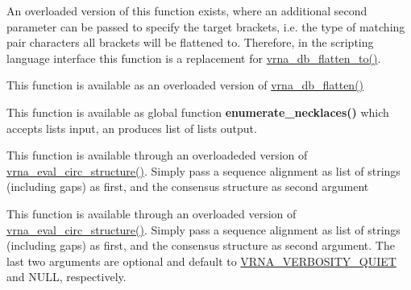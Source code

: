 \begin{DoxyRefList}
An overloaded version of this function exists, where an additional second parameter can be passed to specify the target brackets, i.\+e. the type of matching pair characters all brackets will be flattened to. Therefore, in the scripting language interface this function is a replacement for \hyperlink{group__struct__utils__dot__bracket_ga690425199c8b71545e7196e3af1436f8}{vrna\+\_\+db\+\_\+flatten\+\_\+to()}.  
\item[\label{wrappers__wrappers000095}%
\Hypertarget{wrappers__wrappers000095}%
Global \hyperlink{group__struct__utils__dot__bracket_ga690425199c8b71545e7196e3af1436f8}{vrna\+\_\+db\+\_\+flatten\+\_\+to} (char $\ast$string, const char target\mbox{[}3\mbox{]}, unsigned int options)]This function is available as an overloaded version of \hyperlink{group__struct__utils__dot__bracket_gae966b9f44168a4f4b39ca42ffb5f37b7}{vrna\+\_\+db\+\_\+flatten()}  
\item[\label{wrappers__wrappers000003}%
\Hypertarget{wrappers__wrappers000003}%
Global \hyperlink{group__combinatorics__utils_gae081ac655a76bd5c4b3d86c60b096b75}{vrna\+\_\+enumerate\+\_\+necklaces} (const unsigned int $\ast$type\+\_\+counts)]This function is available as global function {\bfseries enumerate\+\_\+necklaces()} which accepts lists input, an produces list of lists output.  
\item[\label{wrappers__wrappers000046}%
\Hypertarget{wrappers__wrappers000046}%
Global \hyperlink{group__eval_gac96577cf232c71160f762737a994b7c6}{vrna\+\_\+eval\+\_\+circ\+\_\+consensus\+\_\+structure} (const char $\ast$$\ast$alignment, const char $\ast$structure)]This function is available through an overloadeded version of \hyperlink{group__eval_ga3e05a23ddf9b083f4e69881e440d4866}{vrna\+\_\+eval\+\_\+circ\+\_\+structure()}. Simply pass a sequence alignment as list of strings (including gaps) as first, and the consensus structure as second argument  
\item[\label{wrappers__wrappers000056}%
\Hypertarget{wrappers__wrappers000056}%
Global \hyperlink{group__eval_gae89240c230e4740b22a703ee953396b9}{vrna\+\_\+eval\+\_\+circ\+\_\+consensus\+\_\+structure\+\_\+v} (const char $\ast$$\ast$alignment, const char $\ast$structure, int verbosity\+\_\+level, F\+I\+LE $\ast$file)]This function is available through an overloaded version of \hyperlink{group__eval_ga3e05a23ddf9b083f4e69881e440d4866}{vrna\+\_\+eval\+\_\+circ\+\_\+structure()}. Simply pass a sequence alignment as list of strings (including gaps) as first, and the consensus structure as second argument. The last two arguments are optional and default to \hyperlink{group__eval_gaf4afe19780b61b4962c613bde324128b}{V\+R\+N\+A\+\_\+\+V\+E\+R\+B\+O\+S\+I\+T\+Y\+\_\+\+Q\+U\+I\+ET} and N\+U\+LL, respectively.  

\end{DoxyRefList}
